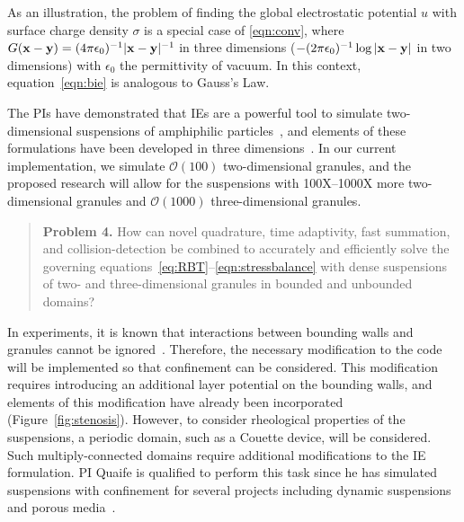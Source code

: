 As an illustration, the problem of finding the global electrostatic
potential $u$ with surface charge density $\sigma$ is a special case of
\eqref{eqn:conv}, where $G(\mathbf{x} - \mathbf{y}) = (4\pi \epsilon_0)^{-1}|\mathbf{x} -
\mathbf{y}|^{-1}$ in three dimensions ($-(2\pi \epsilon_0)^{-1}\log|\mathbf{x} - \mathbf{y}|$
in two dimensions) with $\epsilon_0$ the permittivity of vacuum.  In
this context, equation~\eqref{eqn:bie} is analogous to Gauss's Law.

The PIs have demonstrated that IEs are a powerful tool to simulate
two-dimensional suspensions of amphiphilic particles~\cite{Fu2018_SIAM,
FuQuRyYo22, fu-ryh-qua-you2022}, and elements of these formulations have
been developed in three dimensions~\cite{ying_2006, manasthesis,
rac-gre2016}. In our current implementation, we simulate
$\mathcal{O}(100)$ two-dimensional granules, and the proposed research
will allow for the suspensions with 100X--1000X more two-dimensional
granules and $\mathcal{O}(1000)$ three-dimensional granules. 

\begin{quotation}
  \noindent
  \textbf{Problem 4.} How can novel quadrature, time adaptivity, fast
  summation, and collision-detection be combined to accurately and
  efficiently solve the governing
  equations~\eqref{eq:RBT}--\eqref{eqn:stressbalance} with dense
  suspensions of two- and three-dimensional granules in bounded and
  unbounded domains?
\end{quotation}

In experiments, it is known that interactions between bounding walls and
granules cannot be ignored~\cite{qua-gan-you2021,
KaouiHartingMisbah2011_PRE, her-sto-gra2005}. Therefore, the necessary
modification to the code will be implemented so that confinement can be
considered. This modification requires introducing an additional layer
potential on the bounding walls, and elements of this modification have
already been incorporated (Figure~\ref{fig:stenosis}). However, to
consider rheological properties of the suspensions, a periodic domain,
such as a Couette device, will be considered. Such multiply-connected
domains require additional modifications to the IE formulation. PI
Quaife is qualified to perform this task since he has simulated
suspensions with confinement for several projects including dynamic
suspensions~\cite{qua-bir2014, bys-sha-qua2020} and porous
media~\cite{chi-moo-qua2020, dea-qua-bir-jua2018, moo-che-chi-qua2022,
qua-gan-you2021}.


